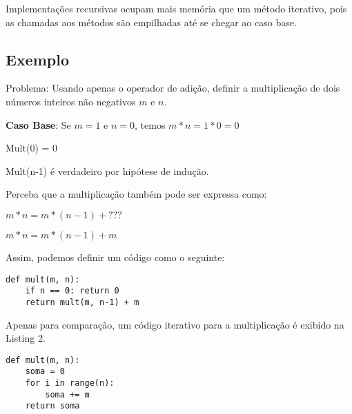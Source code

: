 \documentclass[a4paper, twocolumn]{article}
\theoremstyle{definition}
\begin{document}
Implementações recursivas ocupam mais memória que um método iterativo, pois as chamadas aos métodos são empilhadas até se chegar ao caso base.

\subsection{Exemplo}
Problema: Usando apenas o operador de adição, definir a multiplicação de dois números inteiros não negativos $m$ e $n$.

\textbf{Caso Base}: Se $m=1$ e $n=0$, temos $m*n = 1*0 = 0$

Mult(0) = 0

Mult(n-1) é verdadeiro por hipótese de indução.

Perceba que a multiplicação também pode ser expressa como:

$m*n = m*(n-1) + ???$

$m*n = m*(n-1) + m$

Assim, podemos definir um código como o seguinte:

\begin{lstlisting}[label=max_array,caption= Multiplicação recursiva]
def mult(m, n):
	if n == 0: return 0
	return mult(m, n-1) + m
\end{lstlisting}

Apenas para comparação, um código iterativo para a multiplicação é exibido na Listing 2.
\begin{lstlisting}[label=max_array,caption= Multiplicação iterativa]
def mult(m, n):
	soma = 0	
	for i in range(n):
		soma += m
	return soma
\end{lstlisting}
\end{document}
